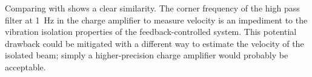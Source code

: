 \documentclass[11pt,a4paper]{memoir}
\begin{document}
Comparing  with  shows a clear
similarity. The corner frequency of the high pass filter at \SI{1}{Hz} in the
charge amplifier to measure velocity is an impediment to the vibration
isolation properties of the feedback-controlled system. This potential
drawback could be mitigated with a different way to estimate the velocity of
the isolated beam; simply a higher-precision charge amplifier would probably
be acceptable.
\end{document}
